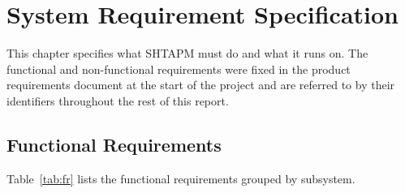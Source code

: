 \chapter{System Requirement Specification}
\label{ch:srs}

This chapter specifies what SHTAPM must do and what it runs on. The functional and non-functional requirements were fixed in the product requirements document at the start of the project and are referred to by their identifiers throughout the rest of this report.

\section{Functional Requirements}

Table~\ref{tab:fr} lists the functional requirements grouped by subsystem.

